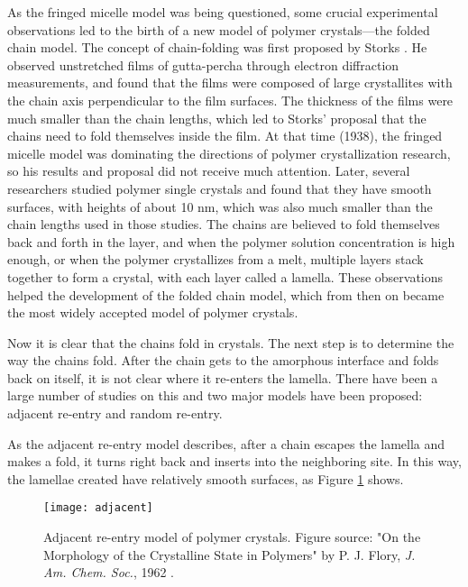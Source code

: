 As the fringed micelle model was being questioned, some crucial experimental observations led to the birth of a new model of polymer crystals---the folded chain model. The concept of chain-folding was first proposed by Storks \cite{Storks1938}. He observed unstretched films of gutta-percha through electron diffraction measurements, and found that the films were composed of large crystallites with the chain axis perpendicular to the film surfaces. The thickness of the films were much smaller than the chain lengths, which led to Storks' proposal that the chains need to fold themselves inside the film.  At that time (1938), the fringed micelle model was dominating the directions of polymer crystallization research, so his results and proposal did not receive much attention. Later, several researchers \cite{JACCODINE1955,Till1957,Keller1957} studied polymer single crystals and found that they have smooth surfaces, with heights of about 10 nm, which was also much smaller than the chain lengths used in those studies. The chains are believed to fold themselves back and forth in the layer, and when the polymer solution concentration is high enough, or when the polymer crystallizes from a melt, multiple layers stack together to form a crystal, with each layer called a lamella. These observations helped the development of the folded chain model, which from then on became the most widely accepted model of polymer crystals. 

Now it is clear that the chains fold in crystals. The next step is to determine the way the chains fold. After the chain gets to the amorphous interface and folds back on itself, it is not clear where it re-enters the lamella. There have been a large number of studies on this \cite{Kovacs1975,Yoon1979,Keller1979} and two major models have been proposed: adjacent re-entry and random re-entry.

As the adjacent re-entry model describes, after a chain escapes the lamella and makes a fold, it turns right back and inserts into the neighboring site. In this way, the lamellae created have relatively smooth surfaces, as Figure \ref{fig:adjacent} shows.

\begin{figure}[H]
\center
\texttt{[image: adjacent]}
\caption[Adjacent re-entry model of polymer crystals.]{Adjacent re-entry model of polymer crystals. Figure source: "On the Morphology of the Crystalline State in Polymers" by P. J. Flory, \textit{J. Am. Chem. Soc.}, 1962 \cite{Flory1962}.}
\label{fig:adjacent}
\end{figure}

